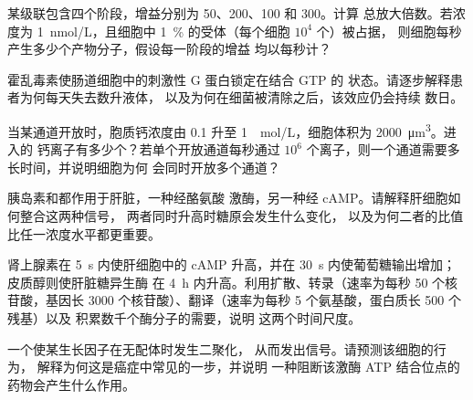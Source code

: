 \begin{exercise}[$\star\star$]\label{exo:b2:cell-signalling:6}
某级联包含四个阶段，增益分别为 50、200、100 和 300。计算
总放大倍数。若浓度为 \qty{1}{nmol/L}，且细胞中
\qty{1}{\%} 的受体（每个细胞 $10^{4}$ 个）被占据，
则细胞每秒产生多少个产物分子，假设每一阶段的增益
均以每秒计？
\end{exercise}

\begin{exercise}[$\star\star$]\label{exo:b2:cell-signalling:7}
霍乱毒素使肠道细胞中的刺激性 G 蛋白锁定在结合 GTP 的
状态。请逐步解释患者为何每天失去数升液体，
以及为何在细菌被清除之后，该效应仍会持续
数日。
\end{exercise}

\begin{exercise}[$\star\star$]\label{exo:b2:cell-signalling:8}
当某通道开放时，胞质钙浓度由 \qty{0.1}{} 升至 \qty{1}{\micro
mol/L}，细胞体积为 \qty{2000}{\micro m^3}。进入的
钙离子有多少个？若单个开放通道每秒通过 $10^{6}$
个离子，则一个通道需要多长时间，并说明细胞为何
会同时开放多个通道？
\end{exercise}

\begin{exercise}[$\star\star$]\label{exo:b2:cell-signalling:9}
胰岛素和都作用于肝脏，一种经酪氨酸
激酶，另一种经 cAMP。请解释肝细胞如何整合这两种信号，
两者同时升高时糖原会发生什么变化，
以及为何二者的比值比任一浓度水平都更重要。
\end{exercise}

\begin{exercise}[$\star\star\star$]\label{exo:b2:cell-signalling:10}
肾上腺素在 \qty{5}{s} 内使肝细胞中的 cAMP 升高，并在
\qty{30}{s} 内使葡萄糖输出增加；皮质醇则使肝脏糖异生酶
在 \qty{4}{h} 内升高。利用扩散、转录（速率为每秒 \qty{50}{}
个核苷酸，基因长 \qty{3000}{} 个核苷酸）、翻译（速率为每秒
\qty{5}{} 个氨基酸，蛋白质长 \num{500} 个残基）以及
积累数千个酶分子的需要，说明
这两个时间尺度。
\end{exercise}

\begin{exercise}[$\star\star\star$]\label{exo:b2:cell-signalling:11}
一个使某生长因子在无配体时发生二聚化，
从而发出信号。请预测该细胞的行为，
解释为何这是癌症中常见的一步，并说明
一种阻断该激酶 ATP 结合位点的药物会产生什么作用。
\end{exercise}

